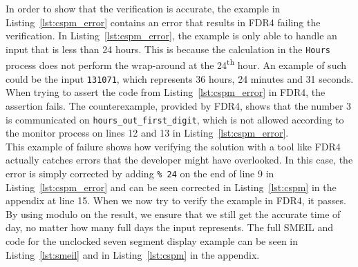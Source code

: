 In order to show that the verification is accurate, the example in Listing~\ref{lst:cspm_error} contains an error that results in FDR4 failing the verification. In Listing~\ref{lst:cspm_error}, the example is only able to handle an input that is less than 24 hours. This is because the calculation in the \texttt{Hours} process does not perform the wrap-around at the 24\textsuperscript{th} hour. An example of such could be the input \texttt{131071}, which represents 36 hours, 24 minutes and 31 seconds. When trying to assert the code from Listing~\ref{lst:cspm_error} in FDR4, the assertion fails. The counterexample, provided by FDR4, shows that the number 3 is communicated on \texttt{hours\_out\_first\_digit}, which is not allowed according to the monitor process on lines 12 and 13 in Listing~\ref{lst:cspm_error}.\\

This example of failure shows how verifying the solution with a tool like FDR4 actually catches errors that the developer might have overlooked. In this case, the error is simply corrected by adding \texttt{\% 24} on the end of line 9 in Listing~\ref{lst:cspm_error} and can be seen corrected in Listing~\ref{lst:cspm} in the appendix at line 15. When we now try to verify the example in FDR4, it passes. By using modulo on the result, we ensure that we still get the accurate time of day, no matter how many full days the input represents.
The full SMEIL and \cspm{} code for the unclocked seven segment display example can be seen in Listing~\ref{lst:smeil} and in Listing~\ref{lst:cspm} in the appendix.

